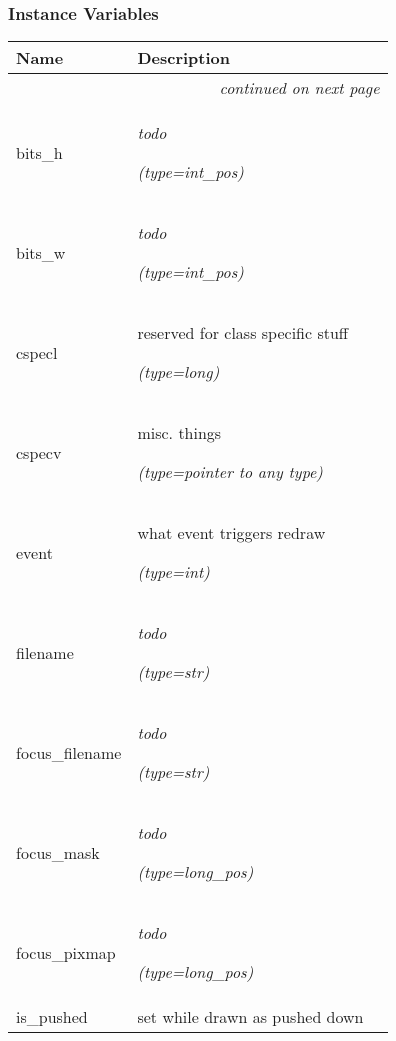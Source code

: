   \subsubsection{Instance Variables}

    \vspace{-1cm}
\hspace{\varindent}\begin{longtable}{|p{\varnamewidth}|p{\vardescrwidth}|l}
\cline{1-2}
\cline{1-2} \centering \textbf{Name} & \centering \textbf{Description}& \\
\cline{1-2}
\endhead\cline{1-2}\multicolumn{3}{r}{\small\textit{continued on next page}}\\\endfoot\cline{1-2}
\endlastfoot\raggedright b\-i\-t\-s\-\_\-h\- & \raggedright \emph{todo}

            {\it (type=int\_pos)}&\\
\cline{1-2}
\raggedright b\-i\-t\-s\-\_\-w\- & \raggedright \emph{todo}

            {\it (type=int\_pos)}&\\
\cline{1-2}
\raggedright c\-s\-p\-e\-c\-l\- & \raggedright reserved for class specific stuff

            {\it (type=long)}&\\
\cline{1-2}
\raggedright c\-s\-p\-e\-c\-v\- & \raggedright misc. things

            {\it (type=pointer to any type)}&\\
\cline{1-2}
\raggedright e\-v\-e\-n\-t\- & \raggedright what event triggers redraw

            {\it (type=int)}&\\
\cline{1-2}
\raggedright f\-i\-l\-e\-n\-a\-m\-e\- & \raggedright \emph{todo}

            {\it (type=str)}&\\
\cline{1-2}
\raggedright f\-o\-c\-u\-s\-\_\-f\-i\-l\-e\-n\-a\-m\-e\- & \raggedright \emph{todo}

            {\it (type=str)}&\\
\cline{1-2}
\raggedright f\-o\-c\-u\-s\-\_\-m\-a\-s\-k\- & \raggedright \emph{todo}

            {\it (type=long\_pos)}&\\
\cline{1-2}
\raggedright f\-o\-c\-u\-s\-\_\-p\-i\-x\-m\-a\-p\- & \raggedright \emph{todo}

            {\it (type=long\_pos)}&\\
\cline{1-2}
\raggedright i\-s\-\_\-p\-u\-s\-h\-e\-d\- & \raggedright set while drawn as pushed down


\end{longtable}
